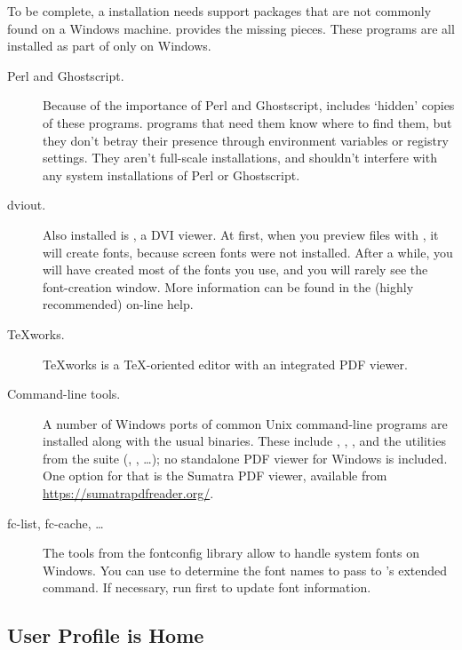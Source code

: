 \documentclass{article}
\begin{document}
To be complete, a \TL{} installation needs support packages that are not
commonly found on a Windows machine. \TL{} provides the missing pieces.
These programs are all installed as part of \TL{} only on Windows.

\begin{description}
\item[Perl and Ghostscript.] Because of the importance of Perl and
  Ghostscript, \TL{} includes `hidden' copies of these
  programs. \TL{} programs that need them know where to find them,
  but they don't betray their presence through environment variables
  or registry settings. They aren't full-scale installations, and
  shouldn't interfere with any system installations of Perl or
  Ghostscript.

\item[dviout.] Also installed is , a DVI viewer.
  At first, when you preview files with , it will create
  fonts, because screen fonts were not installed. After a while, you
  will have created most of the fonts you use, and you will rarely see
  the font-creation window.  More information can be found in the
  (highly recommended) on-line help.

\item[\TeX{}works.]  \TeX{}works is a \TeX-oriented editor with
  an integrated PDF viewer.

\item[Command-line tools.] A number of Windows ports of common Unix
  command-line programs are installed along with the usual \TL{}
  binaries. These include , ,
  , and the utilities from the  suite
  (, , \ldots); no standalone PDF
  viewer for Windows is included.  One option for that is the Sumatra
  PDF viewer, available from \url{https://sumatrapdfreader.org/}.

\item[fc-list, fc-cache, \ldots] The tools from the fontconfig library allow
  \XeTeX{} to handle system fonts on Windows.  You can use
   to determine the font names to pass to \XeTeX's
  extended  command. If necessary, run 
  first to update font information.

\end{description}


\subsection{User Profile is Home}
\label{sec:winhome}
\end{document}
